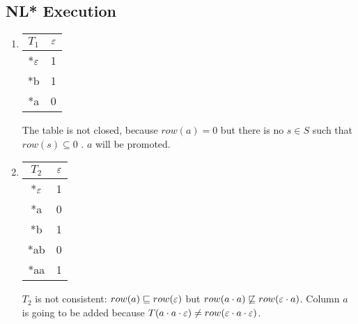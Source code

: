 \subsection{NL* Execution}
\begin{enumerate}
  \item \begin{minipage}{0.3\textwidth}
          \begin{tabular}{c||c}
            $T_1$              & $\varepsilon$ \\
            \hline\hline
            *$\varepsilon$\footnotemark & 1    \\
            \hline\hline
            *b                 & 1    \\
            *a                 & 0    \\
          \end{tabular}
        \end{minipage}  \quad
        \begin{minipage}{0.6\textwidth}
          The table is not closed, because $row(a) = 0$ but there is no $s \in S$ such that $row(s) \subseteq 0$ . $a$ will be promoted.
        \end{minipage}

  \item \begin{minipage}{0.3\textwidth}
          \begin{tabular}{c||c}
            $T_2$ & $\varepsilon$ \\
            \hline\hline
            *$\varepsilon$ & 1    \\
            *a    & 0    \\
            \hline\hline
            *b    & 1    \\
            *ab   & 0    \\
            *aa   & 1    \\
          \end{tabular}
        \end{minipage}\quad
        \begin{minipage}{0.6\textwidth}
          $T_2$ is not consistent: $row(a) \sqsubseteq row(\varepsilon)$ but $row(a \cdot a) \not\sqsubseteq row(\varepsilon \cdot a)$. Column $a$ is going to be added because $T(a \cdot a \cdot \varepsilon) \neq row(\varepsilon \cdot a \cdot \varepsilon)$.
        \end{minipage}


\end{enumerate}
